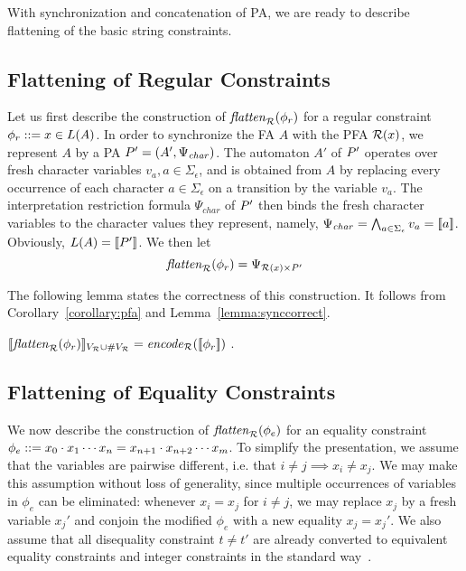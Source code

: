 \documentclass[sigplan,review,anonymous]{acmart}\settopmatter{printfolios=true,printccs=false,printacmref=false}
\begin{document}
With synchronization and concatenation of PA, we are ready to describe flattening of the basic string constraints.

\subsection{Flattening of Regular Constraints} \label{section:mem}

Let us first describe the construction of $\mathit{flatten}_{\mathcal{R}}(\phi_r)$ for a regular constraint $\phi_r ::= x \in L(A)$. 
In order to synchronize the FA $A$ with the PFA $\mathcal{R}(x)$, 
we represent $A$ by a PA $P' = (A',\Psi_{\mathit{char}})$.
The automaton $A'$ of $P'$ operates over fresh character variables $v_a, a\in\Sigma_\epsilon$, 
and is obtained from $A$ by replacing every occurrence of each character $a\in\Sigma_{\epsilon}$ on a transition by the variable $v_a$. 
The interpretation restriction formula $\Psi_{\mathit{char}}$ of $P'$ then binds the fresh character variables to the character values they represent, 
namely, $\Psi_{\mathit{char}} = \bigwedge_{a\in\Sigma_\epsilon} v_a = [\![a]\!]$. Obviously, $L(A) = [\![P']\!]$. 
We then let 
$$\mathit{flatten}_{\mathcal{R}}(\phi_r) = \Psi_{\mathcal{R}(x) \times P'}$$ 

The following lemma states the correctness of this construction. 
It follows from Corollary~\ref{corollary:pfa} and Lemma~\ref{lemma:synccorrect}. 
\begin{lemma}\label{lemma:memcorrect}  $[\![\mathit{flatten}_{\mathcal{R}}(\phi_r)]\!]_{V_{\mathcal{R}} \cup \#V_{\mathcal{R}}} = \mathit{encode}_{\mathcal{R}} ([\![\phi_r]\!])$ . 
\end{lemma}

\subsection{Flattening of Equality Constraints} \label{section:eq}

We now describe the construction of $\mathit{flatten}_{\mathcal{R}}(\phi_e)$ for an equality constraint $\phi_e::= x_0\cdot x_1 \cdots x_n = x_{n+1}\cdot x_{n+2} \cdots x_m$. 
%
To simplify the presentation, we assume that the variables are pairwise different, i.e. that $i\neq j \implies x_i \neq x_j$. We may make this assumption without loss of generality, since multiple occurrences of variables in $\phi_e$ can be eliminated: whenever $x_i = x_j$ for $i \neq j$, we may replace $x_j$ by a fresh variable $x_j'$ and conjoin the modified $\phi_e$ with a new equality $x_j = x_j'$. 
%
We also assume that all disequality constraint $t \neq t'$ are already converted to equivalent equality constraints and integer constraints in the standard way~\cite{abdulla2015norn}.
\end{document}
